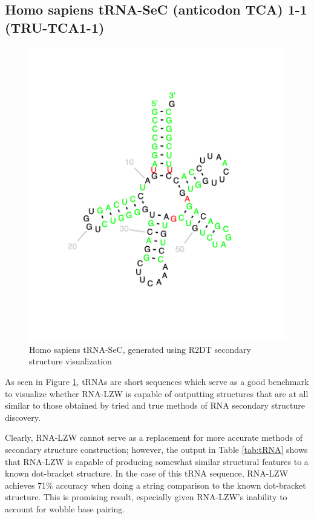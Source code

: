 \documentclass[sigconf]{acmart}
\begin{document}
\subsection{Homo sapiens tRNA-SeC (anticodon TCA) 1-1 (TRU-TCA1-1)}

\begin{figure}
  \includegraphics[width=\linewidth]{for_paper1.png}
  \caption{Homo sapiens tRNA-SeC, generated using R2DT secondary structure visualization}
  \label{fig:tRNA}
\end{figure}

As seen in Figure \ref{fig:tRNA},  tRNAs are short sequences which serve as a good benchmark to visualize whether RNA-LZW is capable of outputting structures that are at all similar to those obtained by tried and true methods of RNA secondary structure discovery. 

Clearly, RNA-LZW cannot serve as a replacement for more accurate methods of secondary structure construction; however, the output in Table \ref{tab:tRNA} shows that RNA-LZW is capable of producing somewhat similar structural features to a known dot-bracket structure.  In the case of this tRNA sequence,  RNA-LZW achieves 71\% accuracy when doing a string comparison to the known dot-bracket structure.  This is promising result, especially given RNA-LZW's inability to account for wobble base pairing.
\end{document}
